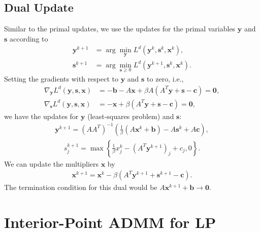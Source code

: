 \documentclass{article}
\begin{document}
\subsection*{Dual Update}
Similar to the primal updates, we use the updates for the primal variables $\mathbf{y}$ and $\mathbf{s}$ according to 
\begin{align}
\mathbf{y}^{k+1} & = \arg \min_{\mathbf{y}} L^{d}(\mathbf{y}^{k},\mathbf{s}^k, \mathbf{x}^{k}),\\
\mathbf{s}^{k+1} & = \arg \min_{\mathbf{s} \geq 0} L^{d}(\mathbf{y}^{k+1},\mathbf{s}^k,\mathbf{x}^{k}).
\end{align}
Setting the gradients with respect to $\mathbf{y}$ and $\mathbf{s}$ to zero, i.e.,
\begin{align}
\nabla_{\mathbf{y}}L^{d}(\mathbf{y},\mathbf{s},\mathbf{x}) & =  -\mathbf{b}-A\mathbf{x}+\beta A\left(A^{T}\mathbf{y}+\mathbf{s}-\mathbf{c}\right)  = \mathbf{0}, \label{eq:dual_y} \\
\nabla_{\mathbf{s}}L^{d}(\mathbf{y},\mathbf{s},\mathbf{x}) & =  -\mathbf{x}+\beta\left(A^{T}\mathbf{y}+\mathbf{s}-\mathbf{c}\right) =  \mathbf{0},
\end{align}
we have the updates for $\mathbf{y}$ (least-squares problem) and $\mathbf{s}$:
\begin{align}\label{eq:y_dual_update}
\mathbf{y}^{k+1} = \left(AA^{T}\right)^{-1}\left(\frac{1}{\beta}\left(A\mathbf{x}^{k}+\mathbf{b}\right)-A\mathbf{s}^{k}+A\mathbf{c}\right),
\end{align}
\begin{align}\label{eq:s_dual_update}
s_j^{k+1} = \max\left\{ \frac{1}{\beta}{x}_j^k-(A^{T}\mathbf{y}^{k+1})_j+{c}_j,0\right\}.
\end{align}
We can update the multipliers $\mathbf{x}$ by
\begin{align}\label{eq:x_dual_update}
\mathbf{x}^{k+1} = \mathbf{x}^k - \beta\left(A^T \mathbf{y}^{k+1} + \mathbf{s}^{k+1} - \mathbf{c}\right).
\end{align}
The termination condition for this dual would be $A \mathbf{x}^{k+1} + \mathbf{b} \to \mathbf{0}$.


\vspace{0.5in}
\section{Interior-Point ADMM for LP}

\vspace{0.1in}
\end{document}
